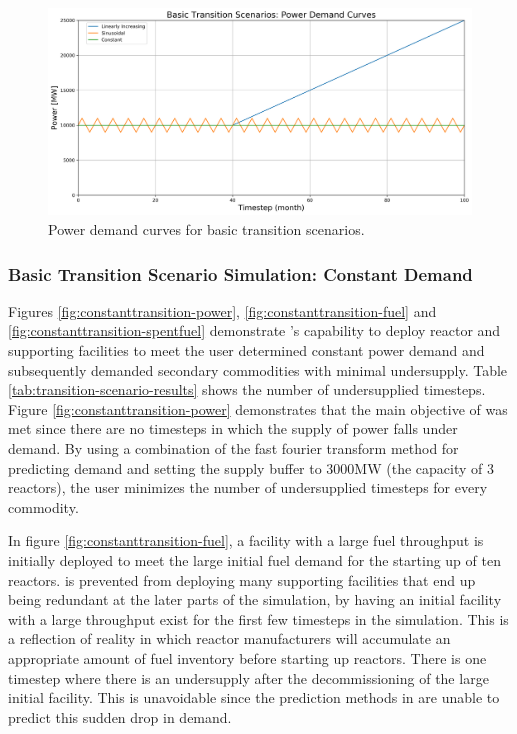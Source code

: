     \begin{figure}[H]
        \begin{center}
            \includegraphics[scale=0.37]{./figures/powerplots.png}
        \end{center}
            \caption{Power demand curves for basic transition scenarios.}
        \label{fig:powerplots}
    \end{figure}

\subsubsection{Basic Transition Scenario Simulation: Constant Demand}
Figures \ref{fig:constanttransition-power}, \ref{fig:constanttransition-fuel}
and \ref{fig:constanttransition-spentfuel} demonstrate \deploy's capability 
to deploy reactor and supporting facilities to meet the user 
determined constant power demand and subsequently demanded 
secondary commodities with minimal undersupply. 
Table \ref{tab:transition-scenario-results} shows the number of 
undersupplied timesteps. 
Figure \ref{fig:constanttransition-power} demonstrates that
the main objective of \deploy was met since there are no timesteps
in which the supply of power falls under demand.
By using a combination of the fast fourier transform method for 
predicting demand and setting the supply buffer to 3000MW 
(the capacity of 3 reactors), the user minimizes the number of 
undersupplied timesteps for every commodity.

In figure \ref{fig:constanttransition-fuel},
a facility with a large fuel throughput is initially
deployed to meet the large initial fuel demand for the starting
up of ten reactors. 
\Deploy is prevented from deploying many supporting
facilities that end up being redundant at the later parts of 
the simulation, by having an initial facility with a large throughput
exist for the first few timesteps in the simulation.
This is a reflection of reality in which reactor manufacturers will 
accumulate an appropriate amount of fuel inventory before starting 
up reactors. 
There is one timestep where there is an undersupply after the 
decommissioning of the large initial facility.  
This is unavoidable since the prediction methods in \deploy are 
unable to predict this sudden drop in demand. 

